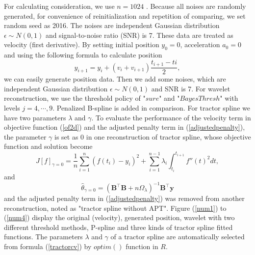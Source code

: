 For calculating consideration, we use $n=1024$ \cite{nason2010wavelet}. Because all noises are randomly generated, for convenience of reinitialization and repetition of comparing, we set random seed as 2016. The noises are independent Gaussian distribution $\epsilon \sim N(0,1)$ and signal-to-noise ratio (SNR) is 7. These data are treated as velocity (first derivative). By setting initial position $y_0=0$, acceleration $a_0=0$ and using the following formula to calculate position
\begin{equation}
y_{i+1}=y_i+(v_i+v_{i+1})\frac{t_{i+1}-ti}{2},
\end{equation}
we can easily generate position data. Then we add some noises, which are independent Gaussian distribution $\epsilon \sim N(0,1)$ and SNR is 7. For wavelet reconstruction, we use the threshold policy of "$sure$" and "$BayesThresh$" with levels $j=4, \cdots, 9$. Penalized B-spline is added in comparison. For tractor spline we have two parameters  $\lambda$ and $\gamma$. To evaluate the performance of the velocity term in objective function (\ref{of2d}) and the adjusted penalty term in (\ref{adjustedpenalty}), the parameter $\gamma$ is set as 0 in one reconstruction of tractor spline, whose objective function and solution become
\begin{equation}\label{ofgamma0}
J[f]_{\gamma=0}= \frac{1}{n} \sum_{i=1}^{n} (f(t_i)-y_i)^2 +\sum_{i=1}^{n-1} \lambda_i\int_{t_i}^{t_{i+1}} f''(t)^2 dt,
\end{equation}
and
\begin{equation}\label{thetahat0}
\hat{\theta}_{\gamma=0}=(\mathbf{B}^\top\mathbf{B}+n\Omega_{\lambda})^{-1}\mathbf{B}^\top\mathbf{y}
\end{equation}
and the adjusted penalty term in (\ref{adjustedpenalty}) was removed from another reconstruction, noted as "tractor spline without APT". Figure (\ref{num1}) to (\ref{num4}) display the original (velocity), generated position, wavelet with two different threshold methods, P-spline and three kinds of tractor spline fitted functions. The parameters $\lambda$ and $\gamma$ of a tractor spline are automatically selected from formula (\ref{tractorcv}) by $\mathit{optim()}$ function in $R$.



